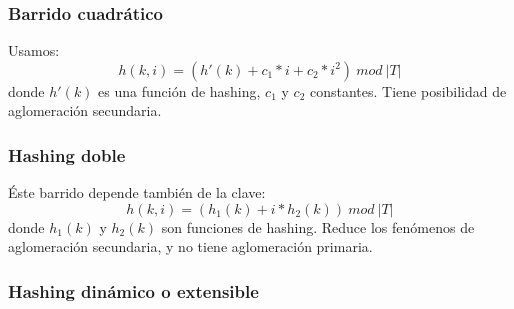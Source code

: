 \subsubsection{Barrido cuadr\'atico}
Usamos:
$$h(k,i) = (h'(k) + c_1 * i + c_2 * i^2)\ mod\ |T|$$
donde $h'(k)$ es una funci\'on de hashing, $c_1$ y $c_2$ constantes. Tiene posibilidad de aglomeraci\'on secundaria.
\subsubsection{Hashing doble}
\'Este barrido depende tambi\'en de la clave:
$$h(k,i) = (h_1(k) + i * h_2(k))\ mod\ |T|$$
donde $h_1(k)$ y $h_2(k)$ son funciones de hashing. Reduce los fen\'omenos de aglomeraci\'on secundaria, y no tiene aglomeraci\'on primaria.
\subsubsection{Hashing din\'amico o extensible}